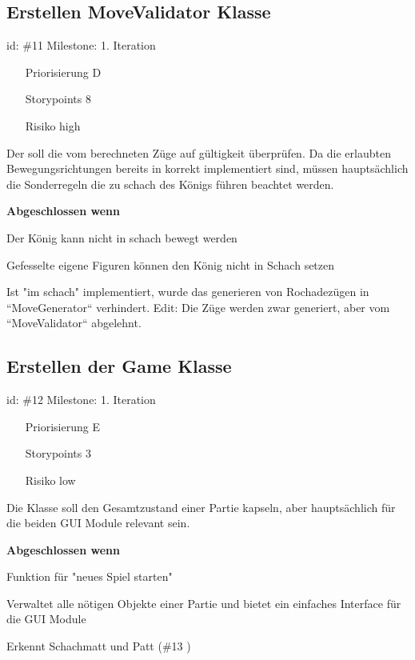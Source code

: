 \subsection*{Erstellen MoveValidator Klasse}
id: \#11 Milestone: 1. Iteration\\

\begin{itemize}
\item[Priorisierung] D
\item[Storypoints] 8
\item[Risiko] high
\end{itemize}

Der  soll die vom  berechneten Züge auf gültigkeit überprüfen. Da die erlaubten Bewegungsrichtungen bereits in  korrekt implementiert sind, müssen hauptsächlich die Sonderregeln die zu schach des Königs führen beachtet werden. 

\textbf{Abgeschlossen wenn}
\begin{todolist}
    \item[\done]  Der König kann nicht in schach bewegt werden
  \item[\done]  Gefesselte eigene Figuren können den König nicht in Schach setzen
  \item[\done]  Ist "im schach" implementiert, wurde das generieren von Rochadezügen in ``MoveGenerator`` verhindert. Edit: Die Züge werden zwar generiert, aber vom ``MoveValidator`` abgelehnt.

\end{todolist}


\subsection*{Erstellen der Game Klasse}
id: \#12 Milestone: 1. Iteration\\

\begin{itemize}
\item[Priorisierung] E
\item[Storypoints] 3
\item[Risiko] low
\end{itemize}

Die  Klasse soll den Gesamtzustand einer Partie kapseln, aber hauptsächlich für die beiden GUI Module relevant sein.

\textbf{Abgeschlossen wenn}
\begin{todolist}
    \item[\done]  Funktion für "neues Spiel starten"
  \item[\done]  Verwaltet alle nötigen Objekte einer Partie und bietet ein einfaches Interface für die GUI Module
  \item[\done]  Erkennt Schachmatt und Patt (\#13 )

\end{todolist}


